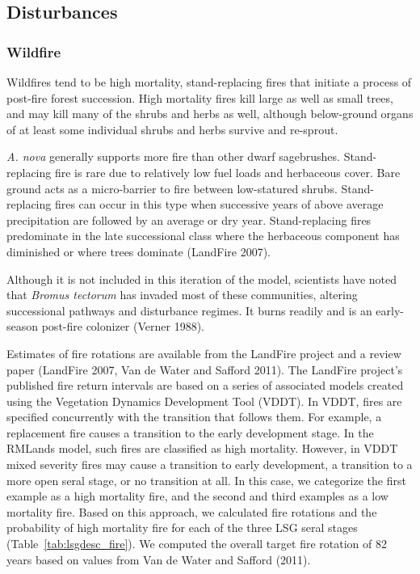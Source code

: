 \subsection*{Disturbances}

\subsubsection{Wildfire}
Wildfires tend to be high mortality, stand-replacing fires that initiate a process of post-fire forest succession. High mortality fires kill large as well as small trees, and may kill many of the shrubs and herbs as well, although below-ground organs of at least some individual shrubs and herbs survive and re-sprout. 

\emph{A. nova} generally supports more fire than other dwarf sagebrushes. Stand-replacing fire is rare due to relatively low fuel loads and herbaceous cover. Bare ground acts as a micro-barrier to fire between low-statured shrubs. Stand-replacing fires can occur in this type when successive years of above average precipitation are followed by an average or dry year. Stand-replacing fires predominate in the late successional class where the herbaceous component has diminished or where trees dominate (LandFire 2007).

Although it is not included in this iteration of the model, scientists have noted that \emph{Bromus tectorum} has invaded most of these communities, altering successional pathways and disturbance regimes. It burns readily and is an early-season post-fire colonizer (Verner 1988).

Estimates of fire rotations are available from the LandFire project and a review paper (LandFire 2007, Van de Water and Safford 2011). The LandFire project’s published fire return intervals are based on a series of associated models created using the Vegetation Dynamics Development Tool (VDDT). In VDDT, fires are specified concurrently with the transition that follows them. For example, a replacement fire causes a transition to the early development stage. In the RMLands model, such fires are classified as high mortality. However, in VDDT mixed severity fires may cause a transition to early development, a transition to a more open seral stage, or no transition at all. In this case, we categorize the first example as a high mortality fire, and the second and third examples as a low mortality fire. Based on this approach, we calculated fire rotations and the probability of high mortality fire for each of the three LSG seral stages (Table~\ref{tab:lsgdesc_fire}). We computed the overall target fire rotation of 82 years based on values from Van de Water and Safford (2011). 




